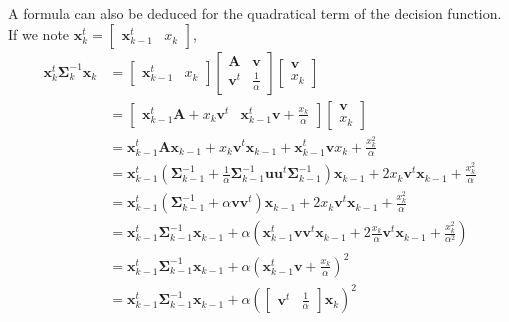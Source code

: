 \documentclass[a4paper]{article}
\begin{document}
        A formula can also be deduced for the quadratical term of the decision function. If we note $\mathbf{x}_{k}^t = \left[\begin{array}{cc} \mathbf{x}_{k-1}^t   & x_k \end{array}\right]$,
        \begin{align*}
            \mathbf{x}_{k}^t \boldsymbol{\Sigma}_{k}^{-1} \mathbf{x}_{k}
            &= \left[\begin{array}{cc} \mathbf{x}_{k-1}^t   & x_k \end{array}\right]
            \left[\begin{array}{cc}
            \mathbf{A}   & \mathbf{v} \\
            \mathbf{v}^t & \frac{1}{\alpha}
            \end{array}\right]
            \left[\begin{array}{c} \mathbf{v} \\ x_k \end{array}\right] \\
            &= \left[\begin{array}{cc} \mathbf{x}_{k-1}^t \mathbf{A} + x_k \mathbf{v}^t & \mathbf{x}_{k-1}^t \mathbf{v} + \frac{x_k}{\alpha} \end{array}\right]
            \left[\begin{array}{c} \mathbf{v} \\ x_k \end{array}\right] \\
            &= \mathbf{x}_{k-1}^t \mathbf{A} \mathbf{x}_{k-1} + x_k \mathbf{v}^t \mathbf{x}_{k-1} + \mathbf{x}_{k-1}^t \mathbf{v} x_k + \frac{x_k^2}{\alpha} \\
            &= \mathbf{x}_{k-1}^t (\boldsymbol{\Sigma}_{k-1}^{-1} + \frac{1}{\alpha} \boldsymbol{\Sigma}_{k-1}^{-1} \mathbf{u} \mathbf{u}^t \boldsymbol{\Sigma}_{k-1}^{-1}) \mathbf{x}_{k-1}
               + 2 x_k \mathbf{v}^t \mathbf{x}_{k-1} + \frac{x_k^2}{\alpha} \\
            &= \mathbf{x}_{k-1}^t (\boldsymbol{\Sigma}_{k-1}^{-1} + \alpha \mathbf{v} \mathbf{v}^t) \mathbf{x}_{k-1}
               + 2 x_k \mathbf{v}^t \mathbf{x}_{k-1} + \frac{x_k^2}{\alpha} \\
            &= \mathbf{x}_{k-1}^t \boldsymbol{\Sigma}_{k-1}^{-1} \mathbf{x}_{k-1} + \alpha ( \mathbf{x}_{k-1}^t \mathbf{v} \mathbf{v}^t \mathbf{x}_{k-1}
               + 2 \frac{x_k}{\alpha} \mathbf{v}^t \mathbf{x}_{k-1} + \frac{x_k^2}{\alpha^2}) \\
            &= \mathbf{x}_{k-1}^t \boldsymbol{\Sigma}_{k-1}^{-1} \mathbf{x}_{k-1} + \alpha ( \mathbf{x}_{k-1}^t \mathbf{v} + \frac{x_k}{\alpha} )^2 \\
            &= \mathbf{x}_{k-1}^t \boldsymbol{\Sigma}_{k-1}^{-1} \mathbf{x}_{k-1} + \alpha ( \left[\begin{array}{cc} \mathbf{v}^t & \frac{1}{\alpha} \end{array}\right] \mathbf{x}_k )^2
        \end{align*}
\end{document}
